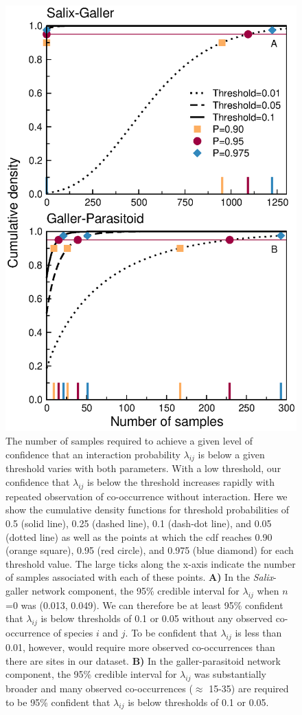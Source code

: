 \documentclass[12pt]{article}
\begin{document}
      \begin{figure}[ht]
        \caption{The number of samples required to achieve a given level of confidence that an interaction probability $\lambda_{ij}$ is below a given threshold varies with both parameters. With a low threshold, our confidence that $\lambda_{ij}$ is below the threshold increases rapidly with repeated observation of co-occurrence without interaction. Here we show the cumulative density functions for threshold probabilities of 0.5 (solid line), 0.25 (dashed line), 0.1 (dash-dot line), and 0.05 (dotted line) as well as the points at which the cdf reaches 0.90 (orange square), 0.95 (red circle), and 0.975 (blue diamond) for each threshold value. The large ticks along the x-axis indicate the number of samples associated with each of these points. \textbf{A)} In the \emph{Salix}-galler network component, the 95\% credible interval for $\lambda_{ij}$ when $n$=0 was (0.013, 0.049). We can therefore be at least 95\% confident that $\lambda_{ij}$ is below thresholds of 0.1 or 0.05 without any observed co-occurrence of species $i$ and $j$. To be confident that $\lambda_{ij}$ is less than 0.01, however, would require more observed co-occurrences than there are sites in our dataset. \textbf{B)} In the galler-parasitoid network component, the 95\% credible interval for $\lambda_{ij}$ was substantially broader and many observed co-occurrences ($\approx$ 15-35) are required to be 95\% confident that $\lambda_{ij}$ is below thresholds of 0.1 or 0.05.}
        \label{Salix_cdfs}
        \includegraphics[width=.8\textwidth]{figures/Salix_Galler_samples_and_cdfs_Zillis.eps}

        \end{figure}
\end{document}
